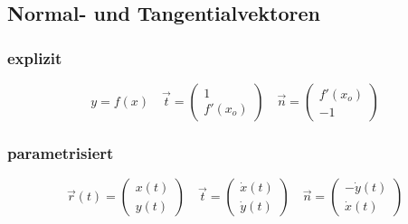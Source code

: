 \subsection{Normal- und Tangentialvektoren}
    \subsubsection{explizit}
    $$
            y = f(x)
        \quad
            \vec{t} = \begin{pmatrix}
                1\\f'(x_o)
            \end{pmatrix}
        \quad 
            \vec{n} = \begin{pmatrix}
                f'(x_o) \\ -1
            \end{pmatrix}
    $$
    \vspace*{-0.25em}
    \subsubsection{parametrisiert}
    $$
            \vec{r}(t) = \begin{pmatrix}
                x(t)\\y(t)
            \end{pmatrix}
        \quad 
            \vec{t} = \begin{pmatrix}
                \dot{x}(t)\\ \dot{y}(t)
            \end{pmatrix}
        \quad 
            \vec{n} = \begin{pmatrix}
                -\dot{y}(t)\\ \dot{x}(t)
            \end{pmatrix}
    $$